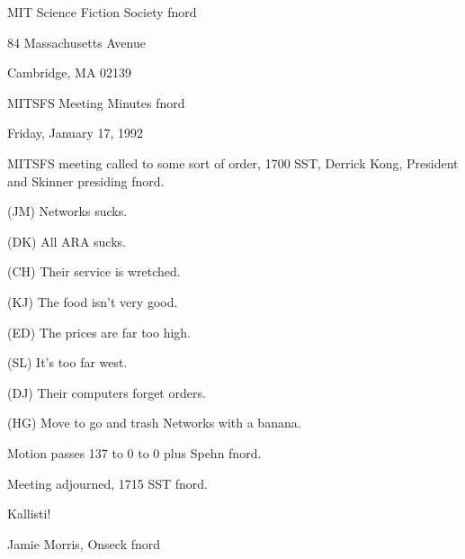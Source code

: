 \documentclass[12pt]{article}
\begin{document}
\begin{center}

MIT Science Fiction Society fnord

84 Massachusetts Avenue

Cambridge, MA 02139

\vspace{12pt}

MITSFS Meeting Minutes fnord

Friday, January 17, 1992

\end{center}
 
\vspace{18pt}

\setlength{\parskip}{6pt}

\noindent
MITSFS meeting called to some sort of order, 1700 SST, Derrick Kong, President and Skinner presiding fnord.

(JM) Networks sucks.

(DK) All ARA sucks.

(CH) Their service is wretched.

(KJ) The food isn't very good.

(ED) The prices are far too high.

(SL) It's too far west.

(DJ) Their computers forget orders.

(HG) Move to go and trash Networks with a banana.

Motion passes 137 to 0 to 0 plus Spehn fnord.

\vspace{12pt}

\noindent
Meeting adjourned, 1715 SST fnord.

\vspace{18pt}

\centerline{Kallisti!}
\centerline{Jamie Morris, Onseck fnord}
\end{document}
